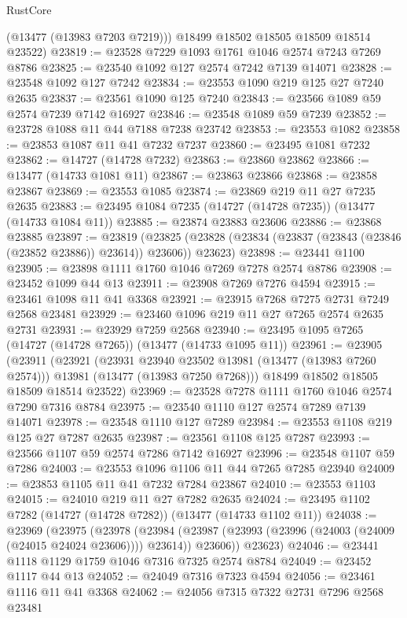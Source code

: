 \begin{lexlean}{RustCore}
\begin{coremodule}
        (@13477 (@13983 @7203 @7219)))
      @18499
      @18502
      @18505
      @18509
      @18514
      @23522)
@23819 := @23528 @7229 @1093 @1761 @1046 @2574 @7243 @7269 @8786
@23825 := @23540 @1092 @127 @2574 @7242 @7139 @14071
@23828 := @23548 @1092 @127 @7242
@23834 := @23553 @1090 @219 @125 @27 @7240 @2635
@23837 := @23561 @1090 @125 @7240
@23843 := @23566 @1089 @59 @2574 @7239 @7142 @16927
@23846 := @23548 @1089 @59 @7239
@23852 := @23728 @1088 @11 @44 @7188 @7238 @23742
@23853 := @23553 @1082
@23858 := @23853 @1087 @11 @41 @7232 @7237
@23860 := @23495 @1081 @7232
@23862 := @14727 (@14728 @7232)
@23863 := @23860 @23862
@23866 := @13477 (@14733 @1081 @11)
@23867 := @23863 @23866
@23868 := @23858 @23867
@23869 := @23553 @1085
@23874 := @23869 @219 @11 @27 @7235 @2635
@23883 := @23495 @1084 @7235 (@14727 (@14728 @7235)) (@13477 (@14733 @1084 @11))
@23885 := @23874 @23883 @23606
@23886 := @23868 @23885
@23897 := @23819
    (@23825 (@23828 (@23834 (@23837 (@23843 (@23846 (@23852 @23886)) @23614)) @23606)) @23623)
@23898 := @23441 @1100
@23905 := @23898 @1111 @1760 @1046 @7269 @7278 @2574 @8786
@23908 := @23452 @1099 @44 @13
@23911 := @23908 @7269 @7276 @4594
@23915 := @23461 @1098 @11 @41 @3368
@23921 := @23915 @7268 @7275 @2731 @7249 @2568 @23481
@23929 := @23460 @1096 @219 @11 @27 @7265 @2574 @2635 @2731
@23931 := @23929 @7259 @2568
@23940 := @23495 @1095 @7265 (@14727 (@14728 @7265)) (@13477 (@14733 @1095 @11))
@23961 := @23905
    (@23911
      (@23921
        (@23931 @23940 @23502 @13981 (@13477 (@13983 @7260 @2574)))
        @13981
        (@13477 (@13983 @7250 @7268)))
      @18499
      @18502
      @18505
      @18509
      @18514
      @23522)
@23969 := @23528 @7278 @1111 @1760 @1046 @2574 @7290 @7316 @8784
@23975 := @23540 @1110 @127 @2574 @7289 @7139 @14071
@23978 := @23548 @1110 @127 @7289
@23984 := @23553 @1108 @219 @125 @27 @7287 @2635
@23987 := @23561 @1108 @125 @7287
@23993 := @23566 @1107 @59 @2574 @7286 @7142 @16927
@23996 := @23548 @1107 @59 @7286
@24003 := @23553 @1096 @1106 @11 @44 @7265 @7285 @23940
@24009 := @23853 @1105 @11 @41 @7232 @7284 @23867
@24010 := @23553 @1103
@24015 := @24010 @219 @11 @27 @7282 @2635
@24024 := @23495 @1102 @7282 (@14727 (@14728 @7282)) (@13477 (@14733 @1102 @11))
@24038 := @23969
    (@23975
      (@23978
        (@23984 (@23987 (@23993 (@23996 (@24003 (@24009 (@24015 @24024 @23606)))) @23614)) @23606))
      @23623)
@24046 := @23441 @1118 @1129 @1759 @1046 @7316 @7325 @2574 @8784
@24049 := @23452 @1117 @44 @13
@24052 := @24049 @7316 @7323 @4594
@24056 := @23461 @1116 @11 @41 @3368
@24062 := @24056 @7315 @7322 @2731 @7296 @2568 @23481

\end{coremodule}
\end{lexlean}

